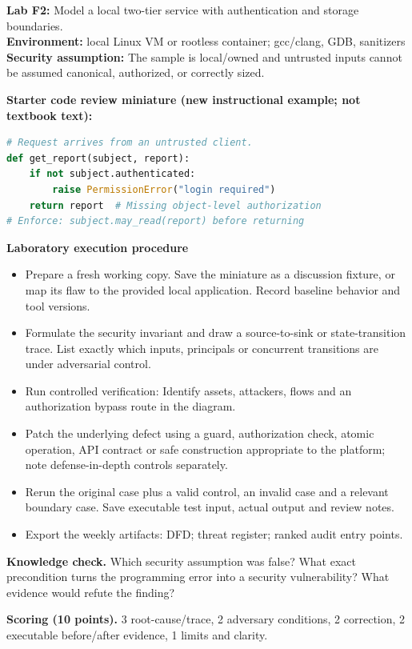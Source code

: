 \documentclass[10pt,letterpaper]{article}
\begin{document}
\begin{insight}\textbf{Lab F2:} Model a local two-tier service with authentication and storage boundaries.\\\textbf{Environment:} local Linux VM or rootless container; gcc/clang, GDB, sanitizers\\\textbf{Security assumption:} The sample is local/owned and untrusted inputs cannot be assumed canonical, authorized, or correctly sized.\end{insight}
\textbf{Starter code review miniature (new instructional example; not textbook text):}
\begin{lstlisting}[language=Python]
# Request arrives from an untrusted client.
def get_report(subject, report):
    if not subject.authenticated:
        raise PermissionError("login required")
    return report  # Missing object-level authorization
# Enforce: subject.may_read(report) before returning
\end{lstlisting}
\textbf{Laboratory execution procedure}
\begin{itemize}[leftmargin=*,itemsep=2pt]
\item Prepare a fresh working copy. Save the miniature as a discussion fixture, or map its flaw to the provided local application. Record baseline behavior and tool versions.
\item Formulate the security invariant and draw a source-to-sink or state-transition trace. List exactly which inputs, principals or concurrent transitions are under adversarial control.
\item Run controlled verification: Identify assets, attackers, flows and an authorization bypass route in the diagram.
\item Patch the underlying defect using a guard, authorization check, atomic operation, API contract or safe construction appropriate to the platform; note defense-in-depth controls separately.
\item Rerun the original case plus a valid control, an invalid case and a relevant boundary case. Save executable test input, actual output and review notes.
\item Export the weekly artifacts: DFD; threat register; ranked audit entry points.
\end{itemize}
\textbf{Knowledge check.} Which security assumption was false? What exact precondition turns the programming error into a security vulnerability? What evidence would refute the finding?

\textbf{Scoring (10 points).} 3 root-cause/trace, 2 adversary conditions, 2 correction, 2 executable before/after evidence, 1 limits and clarity.
\end{document}
